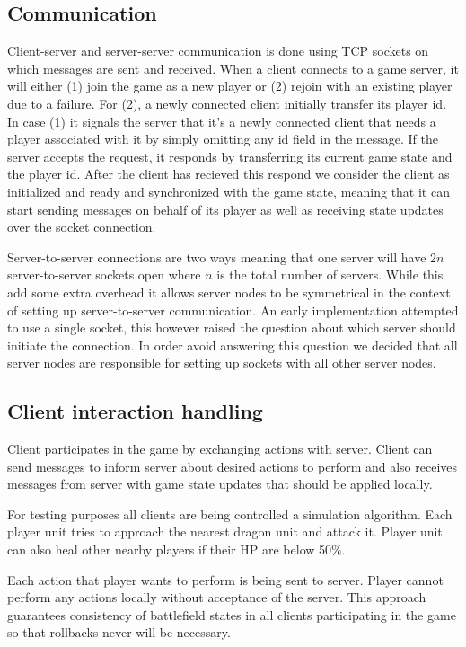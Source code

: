 \documentclass[a4paper]{article}
\begin{document}
\subsection{Communication}
Client-server and server-server communication is done using TCP sockets on which messages are sent and received. When a client connects to a game server, it will either (1) join the game as a new player or (2) rejoin with an existing player due to a failure. For (2), a newly connected client initially transfer its player id. In case (1) it signals the server that it's a newly connected client that needs a player associated with it by simply omitting any id field in the message. If the server accepts the request, it responds by transferring its current game state and the player id. After the client has recieved this respond we consider the client as initialized and ready and synchronized with the game state, meaning that it can start sending messages on behalf of its player as well as receiving state updates over the socket connection.

Server-to-server connections are two ways meaning that one server will have $2n$ server-to-server sockets open where $n$ is the total number of servers. While this add some extra overhead it allows server nodes to be symmetrical in the context of setting up server-to-server communication. An early implementation attempted to use a single socket, this however raised the question about which server should initiate the connection. In order avoid answering this question we decided that all server nodes are responsible for setting up sockets with all other server nodes.

\subsection{Client interaction handling}\label{design fault-tolerance}
Client participates in the game by exchanging actions with server. Client can send messages to inform server about desired actions to perform and also receives messages from server with game state updates that should be applied locally.

For testing purposes all clients are being controlled a simulation algorithm. Each player unit tries to approach the nearest dragon unit and attack it. Player unit can also heal other nearby players if their HP are below 50\%.

Each action that player wants to perform is being sent to server. Player cannot perform any actions locally without acceptance of the server. This approach guarantees consistency of battlefield states in all clients participating in the game so that rollbacks never will be necessary.
\end{document}
